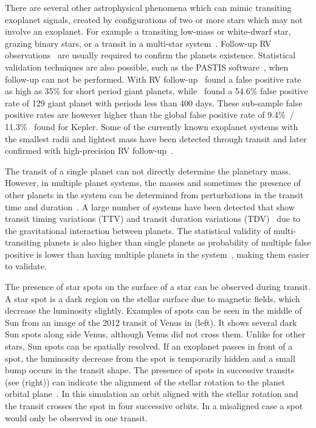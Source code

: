 There are several other astrophysical phenomena which can mimic transiting exoplanet signals, created by configurations of two or more stars which may not involve an exoplanet.
For example a transiting low-mass or white-dwarf star, grazing binary stars, or a transit in a multi-star system~\citep[see e.g.][]{cameron_extrasolar_2012, santerne_contribution_2013}.
Follow-up {RV} observations~\citep[e.g.][]{santerne_radial_2011} are usually required to confirm the planets existence.
Statistical validation techniques are also possible, such as the PASTIS software~\cite{diaz_pastis_2014}, when follow-up can not be performed.
With {RV} follow-up~\citet{santerne_sophie_2012} found a false positive rate as high as 35\% for short period giant planets, while~\citet{santerne_sophie_2016} found a 54.6\% false positive rate of 129 giant planet with periods less than 400 days.
These sub-sample false positive rates are however higher than the global false positive rate of 9.4\%~\citep{fressin_false_2013}/ 11.3\%~\citep{santerne_contribution_2013} found for Kepler.
Some of the currently known exoplanet systems with the smallest radii and lightest mass have been detected through transit and later confirmed with high-precision {RV} follow-up~\citep[e.g.][]{queloz_corot7_2009, pepe_earthsized_2013, lopez-morales_kepler21b_2016, ment_second_2018}.

The transit of a single planet can not directly determine the planetary mass.
However, in multiple planet systems, the masses and sometimes the presence of other planets in the system can be determined from perturbations in the transit time and duration~\citep[e.g.][]{holman_use_2005, holman_kepler9_2010}.
A large number of systems have been detected that show transit timing variations (TTV) and transit duration variations (TDV)~\citep[e.g.][]{holczer_transit_2016} due to the gravitational interaction between planets.
The statistical validity of multi-transiting planets is also higher than single planets as probability of multiple false positive is lower than having multiple planets in the system~\citep{lissauer_almost_2012}, making them easier to validate.

The presence of star spots on the surface of a star can be observed during transit.
A star spot is a dark region on the stellar surface due to magnetic fields, which decrease the luminosity slightly. Examples of spots can be seen in the middle of Sun from an image of the 2012 transit of Venus in  (left). It shows several dark Sun spots along side Venus, although Venus did not cross them. Unlike for other stars, Sun spots can be spatially resolved.
If an exoplanet passes in front of a spot, the luminosity decrease from the spot is temporarily hidden and a small bump occurs in the transit shape.
The presence of spots in successive transits (see  (right)) can indicate the alignment of the stellar rotation to the planet orbital plane~\citep{sanchis-ojeda_starspots_2013}. In this simulation an orbit aligned with the stellar rotation and the transit crosses the spot in four successive orbits. In a misaligned case a spot would only be observed in one transit.

